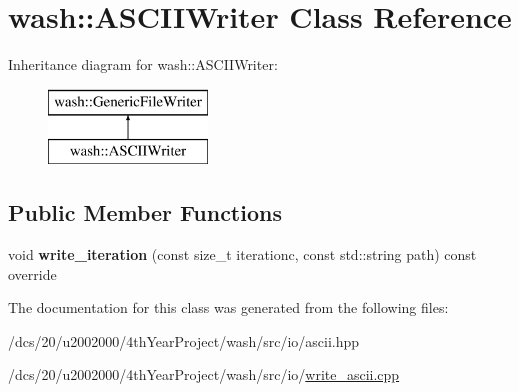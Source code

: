 \hypertarget{classwash_1_1ASCIIWriter}{}\section{wash\+:\+:A\+S\+C\+I\+I\+Writer Class Reference}
\label{classwash_1_1ASCIIWriter}
Inheritance diagram for wash\+:\+:A\+S\+C\+I\+I\+Writer\+:\begin{figure}[H]
\begin{center}
\leavevmode
\includegraphics[height=2.000000cm]{classwash_1_1ASCIIWriter}
\end{center}
\end{figure}
\subsection*{Public Member Functions}
\begin{DoxyCompactItemize}
\item 
\mbox{\label{classwash_1_1ASCIIWriter_afcf4927fda39820cce68e69e6802f72a}} 
void {\bfseries write\+\_\+iteration} (const size\+\_\+t iterationc, const std\+::string path) const override
\end{DoxyCompactItemize}


The documentation for this class was generated from the following files\+:\begin{DoxyCompactItemize}
\item 
/dcs/20/u2002000/4th\+Year\+Project/wash/src/io/ascii.\+hpp\item 
/dcs/20/u2002000/4th\+Year\+Project/wash/src/io/\mbox{\hyperlink{write__ascii_8cpp}{write\+\_\+ascii.\+cpp}}\end{DoxyCompactItemize}
